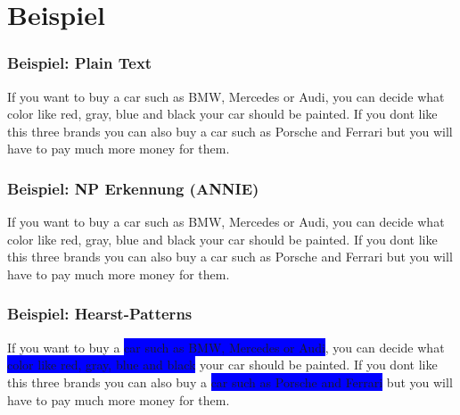 
\section{Beispiel}
\label{sec:beispiel}

\begin{frame}
  \frametitle{Beispiel: Plain Text}

  \begin{justify}
    If you want to buy a car such as BMW, Mercedes or Audi, you can
    decide what color like red, gray, blue and black your car should be
    painted. If you dont like this three brands you can also buy a car
    such as Porsche and Ferrari but you will have to pay much more money
    for them.
  \end{justify}

\end{frame}

\begin{frame}
  \frametitle{Beispiel: NP Erkennung (ANNIE)}

  \begin{justify} %
    If you want to buy a {\color{red}car} such as {\color{red}BMW}, {\color{red}Mercedes} or {\color{red}Audi}, you can
    decide what {\color{red}color} like {\color{red}red}, {\color{red}gray}, {\color{red}blue} and {\color{red}black} your {\color{red}car} should be
    painted. If you dont like this three {\color{red}brands} you can also buy a {\color{red}car}
    such as {\color{red}Porsche} and {\color{red}Ferrari} but you will have to pay much more {\color{red}money}
    for them.
  \end{justify}

\end{frame}

\begin{frame}
  \frametitle{Beispiel: Hearst-Patterns}

  \begin{justify} %
    If you want to buy a \colorbox{blue}{{\color{red}car} such as {\color{red}BMW}, {\color{red}Mercedes} or {\color{red}Audi}}, you can
    decide what \colorbox{blue}{{\color{red}color} like {\color{red}red}, {\color{red}gray}, {\color{red}blue} and {\color{red}black}} your {\color{red}car} should be
    painted. If you dont like this three {\color{red}brands} you can
    also buy a \newline\colorbox{blue}{{\color{red}car}
    such as {\color{red}Porsche} and {\color{red}Ferrari}} but you
  will have to pay much \newline more {\color{red}money}
    for them.
  \end{justify}

\end{frame}